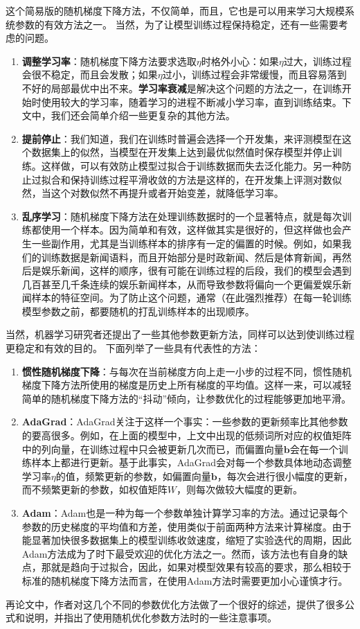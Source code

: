\documentclass[10pt,a4paper]{ctexart}
\begin{document}
这个简易版的随机梯度下降方法，不仅简单，而且，它也是可以用来学习大规模系统参数的有效方法之一。
当然，为了让模型训练过程保持稳定，还有一些需要考虑的问题。
\begin{enumerate}
\item[] \textbf{调整学习率}：随机梯度下降方法要求选取$\eta$时格外小心：如果$\eta$过大，训练过程会很不稳定，而且会发散；如果$\eta$过小，训练过程会非常缓慢，而且容易落到不好的局部最优中出不来。\textbf{学习率衰减}是解决这个问题的方法之一，在训练开始时使用较大的学习率，随着学习的进程不断减小学习率，直到训练结束。下文中，我们还会简单介绍一些更复杂的其他方法。
\item[] \textbf{提前停止}：我们知道，我们在训练时普遍会选择一个开发集，来评测模型在这个数据集上的似然，当模型在开发集上达到最优似然值时保存模型并停止训练。这样做，可以有效防止模型过拟合于训练数据而失去泛化能力。另一种防止过拟合和保持训练过程平滑收敛的方法是这样的，在开发集上评测对数似然，当这个对数似然不再提升或者开始变差，就降低学习率。
\item[] \textbf{乱序学习}：随机梯度下降方法在处理训练数据时的一个显著特点，就是每次训练都使用一个样本。因为简单和有效，这样做其实是很好的，但这样做也会产生一些副作用，尤其是当训练样本的排序有一定的偏置的时候。例如，如果我们的训练数据是新闻语料，而且开始部分是时政新闻、然后是体育新闻，再然后是娱乐新闻，这样的顺序，很有可能在训练过程的后段，我们的模型会遇到几百甚至几千条连续的娱乐新闻样本，从而导致参数将偏向一个更偏爱娱乐新闻样本的特征空间。为了防止这个问题，通常（在此强烈推荐）在每一轮训练模型参数之前，都要随机的打乱训练样本的出现顺序。
\end{enumerate}

当然，机器学习研究者还提出了一些其他参数更新方法，同样可以达到使训练过程更稳定和有效的目的。
下面列举了一些具有代表性的方法：
\begin{enumerate}
\item[] \textbf{惯性随机梯度下降\cite{holyoak1987parallel}}：与每次在当前梯度方向上走一小步的过程不同，惯性随机梯度下降方法所使用的梯度是历史上所有梯度的平均值。这样一来，可以减轻简单的随机梯度下降方法的“抖动”倾向，让参数优化的过程能够更加地平滑。
\item[] \textbf{AdaGrad\cite{duchi2011adaptive}}：AdaGrad关注于这样一个事实：一些参数的更新频率比其他参数的要高很多。例如，在上面的模型中，上文中出现的低频词所对应的权值矩阵中的列向量，在训练过程中只会被更新几次而已，而偏置向量$\textbf{b}$会在每一个训练样本上都进行更新。基于此事实，AdaGrad会对每一个参数具体地动态调整学习率$\eta$的值，频繁更新的参数，如偏置向量$\textbf{b}$，每次会进行很小幅度的更新，而不频繁更新的参数，如权值矩阵$W$，则每次做较大幅度的更新。
\item[] \textbf{Adam\cite{kingma2014adam}}：Adam也是一种为每一个参数单独计算学习率的方法。通过记录每个参数的历史梯度的平均值和方差，使用类似于前面两种方法来计算梯度。由于能显著加快很多数据集上的模型训练收敛速度，缩短了实验迭代的周期，因此Adam方法成为了时下最受欢迎的优化方法之一。然而，该方法也有自身的缺点，那就是趋向于过拟合，因此，如果对模型效果有较高的要求，那么相较于标准的随机梯度下降方法而言，在使用Adam方法时需要更加小心谨慎才行。
\end{enumerate}
再论文\cite{ruder2016overview}中，作者对这几个不同的参数优化方法做了一个很好的综述，提供了很多公式和说明，并指出了使用随机优化参数方法时的一些注意事项。
\end{document}

